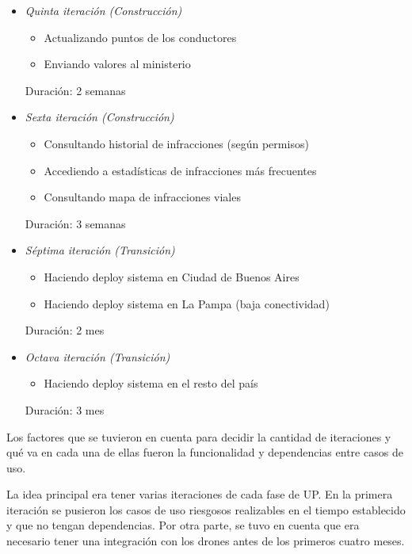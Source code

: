 \begin{itemize}
\item \textit{Quinta iteración (Construcción)}
\begin{itemize}
\item Actualizando puntos de los conductores 
\item Enviando valores al ministerio 
\end{itemize}

Duración: 2 semanas

\item \textit{Sexta iteración (Construcción)}
\begin{itemize}
\item Consultando historial de infracciones (según permisos) 
\item Accediendo a estadísticas de infracciones más frecuentes 
\item Consultando mapa de infracciones viales 
\end{itemize}

Duración: 3 semanas

\item \textit{Séptima iteración (Transición)}
\begin{itemize}
\item Haciendo deploy sistema en Ciudad de Buenos Aires 
\item Haciendo deploy sistema en La Pampa (baja conectividad) 
\end{itemize}

Duración: 2 mes

\item \textit{Octava iteración (Transición)}
\begin{itemize}
\item Haciendo deploy sistema en el resto del país
\end{itemize}

Duración: 3 mes

\end{itemize}

Los factores que se tuvieron en cuenta para decidir la cantidad de iteraciones y 
qué va en cada una de ellas fueron la funcionalidad y dependencias entre casos de uso.

La idea principal era tener varias iteraciones de cada fase de UP. En la primera 
iteración se pusieron los casos de uso riesgosos realizables en el tiempo 
establecido y que no tengan dependencias. Por otra parte, se tuvo en cuenta que era 
necesario tener una integración con los drones antes de los primeros cuatro meses.

